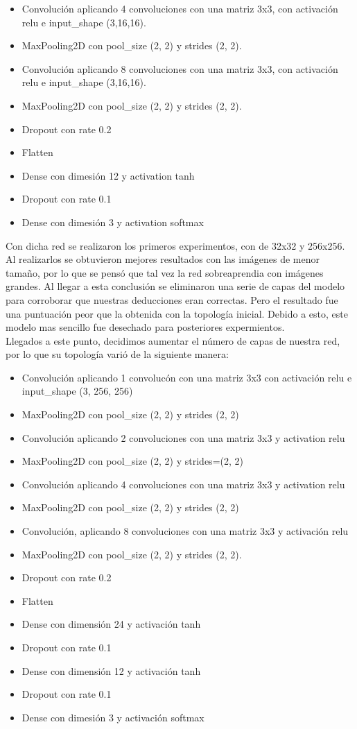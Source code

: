 \begin{itemize}
\item Convolución aplicando 4 convoluciones con una matriz 3x3, con activación relu e input\_shape (3,16,16).
\item MaxPooling2D con pool\_size (2, 2) y strides (2, 2).
\item Convolución aplicando 8 convoluciones con una matriz 3x3, con activación relu e input\_shape (3,16,16).
\item MaxPooling2D con pool\_size (2, 2) y strides (2, 2).
\item Dropout con rate 0.2
\item Flatten
\item Dense con dimesión 12 y activation tanh
\item Dropout con rate 0.1
\item Dense con dimesión 3 y activation softmax
\end{itemize}

Con dicha red se realizaron los primeros experimentos, con  de 32x32 y 256x256. Al realizarlos se obtuvieron mejores resultados con las imágenes de menor tamaño, por lo que se pensó que tal vez la red sobreaprendia con imágenes grandes. Al llegar a esta conclusión se eliminaron una serie de capas del modelo para corroborar que nuestras deducciones eran correctas. Pero el resultado fue una puntuación peor que la obtenida con la topología inicial. Debido a esto, este modelo mas sencillo fue desechado para posteriores expermientos.\\

Llegados a este punto, decidimos aumentar el número de capas de nuestra red, por lo que su topología varió de la siguiente manera:

\begin{itemize}
\item Convolución aplicando 1 convolucón con una matriz 3x3 con activación relu e input\_shape (3, 256, 256)
\item MaxPooling2D con pool\_size (2, 2) y strides (2, 2)
\item Convolución aplicando 2 convoluciones con una matriz 3x3 y activation relu
\item MaxPooling2D con pool\_size (2, 2) y strides=(2, 2)
\item Convolución aplicando 4 convoluciones con una matriz 3x3 y activation relu
\item MaxPooling2D con pool\_size (2, 2) y strides (2, 2)
\item Convolución, aplicando 8 convoluciones con una matriz 3x3 y activación relu
\item MaxPooling2D con pool\_size (2, 2) y strides (2, 2).
\item Dropout con rate 0.2
\item Flatten
\item Dense con dimensión 24 y activación tanh
\item Dropout con rate 0.1
\item Dense con dimensión 12 y activación tanh
\item Dropout con rate 0.1
\item Dense con dimesión 3 y activación softmax
\end{itemize}

